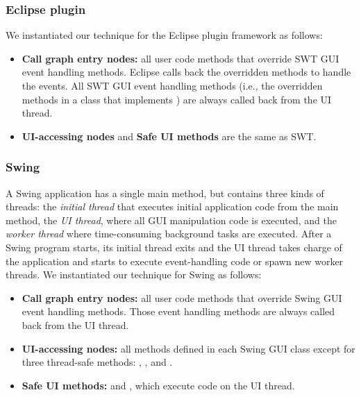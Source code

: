 \tinystep
\tinystep
\subsubsection{Eclipse plugin}

We instantiated our technique for the Eclipse plugin framework as follows:

\preitemizespace

\begin{itemize}

\item \textbf{Call graph entry nodes:}  all user code methods that override
 SWT GUI event handling methods. Eclipse
calls back the overridden methods to handle the
events. All SWT GUI event handling methods (i.e., the overridden
methods in a class that implements ) are
always called back from the UI thread.

\tinystep

\item \textbf{UI-accessing nodes} and \textbf{Safe UI methods} are the same as SWT\@.

\end{itemize}

\tinystep
\tinystep
\tinystep
\subsubsection{Swing}

A Swing application has a single main method, but contains three kinds of
threads: the \textit{initial thread} that executes initial application code from the main method,
the \textit{UI thread}, where all GUI manipulation code is executed,
and the \textit{worker thread} where time-consuming background tasks are executed.
After a Swing program starts, its initial thread exits and the UI thread takes charge
of the application and starts to execute event-handling code or spawn new worker threads. 
We instantiated our technique for Swing as follows:

\preitemizespace

\begin{itemize}

\item \textbf{Call graph entry nodes:} all user code methods that override
Swing GUI event handling methods. Those event handling methods are always
called back from the UI thread.

\tinystep

\item \textbf{UI-accessing nodes:} %
all methods defined in each Swing GUI class except for three thread-safe
methods: , , and .

\tinystep

\item \textbf{Safe UI methods:}  
 and , which execute code on the UI thread.

\end{itemize}

